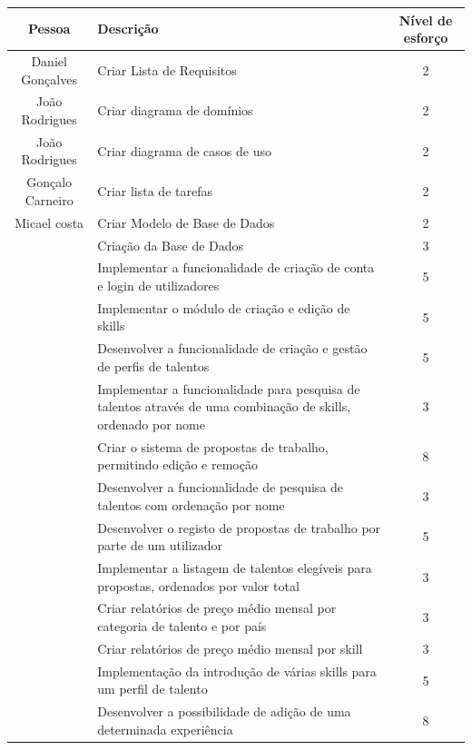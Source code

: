 \renewcommand{\arraystretch}{1.3}
\begin{center} %
\begin{longtable}{|c|p{7cm}|c|}
\hline
\textbf{Pessoa} & \textbf{Descrição} & \textbf{Nível de esforço} \\
\hline
Daniel Gonçalves & Criar Lista de Requisitos & 2 \\
\hline
João Rodrigues & Criar diagrama de domínios & 2 \\
\hline
João Rodrigues & Criar diagrama de casos de uso & 2 \\
\hline
Gonçalo Carneiro & Criar lista de tarefas & 2 \\
\hline
Micael costa & Criar Modelo de Base de Dados & 2 \\
\hline
 & Criação da Base de Dados & 3 \\
\hline
 & Implementar a funcionalidade de criação de conta e login de utilizadores & 5 \\
\hline
 & Implementar o módulo de criação e edição de skills & 5 \\
\hline
 & Desenvolver a funcionalidade de criação e gestão de perfis de talentos & 5 \\
\hline
 & Implementar a funcionalidade para pesquisa de talentos através de uma combinação de skills, ordenado por nome & 3 \\
\hline
 & Criar o sistema de propostas de trabalho, permitindo edição e remoção & 8 \\
\hline
 & Desenvolver a funcionalidade de pesquisa de talentos com ordenação por nome & 3 \\
\hline
 & Desenvolver o registo de propostas de trabalho por parte de um utilizador & 5 \\
\hline
 & Implementar a listagem de talentos elegíveis para propostas, ordenados por valor total & 3 \\
\hline
 & Criar relatórios de preço médio mensal por categoria de talento e por país & 3 \\
\hline
 & Criar relatórios de preço médio mensal por skill & 3 \\
\hline
 & Implementação da introdução de várias skills para um perfil de talento & 5 \\
\hline
 & Desenvolver a possibilidade de adição de uma determinada experiência & 8 \\
\hline
\end{longtable}
\end{center}


